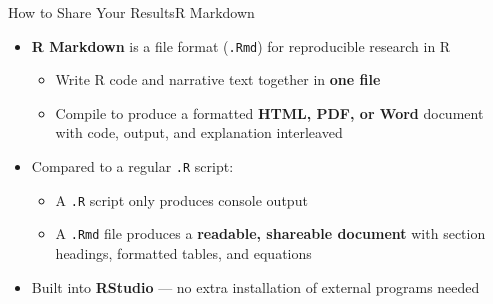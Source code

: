 \documentclass[dvipsnames,hyperref={pdfpagelabels=false}]{beamer}
\begin{document}
\begin{frame}{How to Share Your Results}{R Markdown}

	\begin{itemize}
		\item \textbf{R Markdown} is a file format (\texttt{.Rmd}) for reproducible research in R
		\vspace{0.3cm}
		\begin{itemize}
			\item Write R code and narrative text together in \textbf{one file}
			\vspace{0.2cm}
			\item Compile to produce a formatted \textbf{HTML, PDF, or Word} document with code, output, and explanation interleaved
		\end{itemize}
		\vspace{0.3cm}
		\item Compared to a regular \texttt{.R} script:
		\vspace{0.2cm}
		\begin{itemize}
			\item A \texttt{.R} script only produces console output
			\vspace{0.2cm}
			\item A \texttt{.Rmd} file produces a \textbf{readable, shareable document} with section headings, formatted tables, and equations
		\end{itemize}
		\vspace{0.3cm}
		\item Built into \textbf{RStudio} --- no extra installation of external programs needed
	\end{itemize}

\end{frame}
\end{document}
